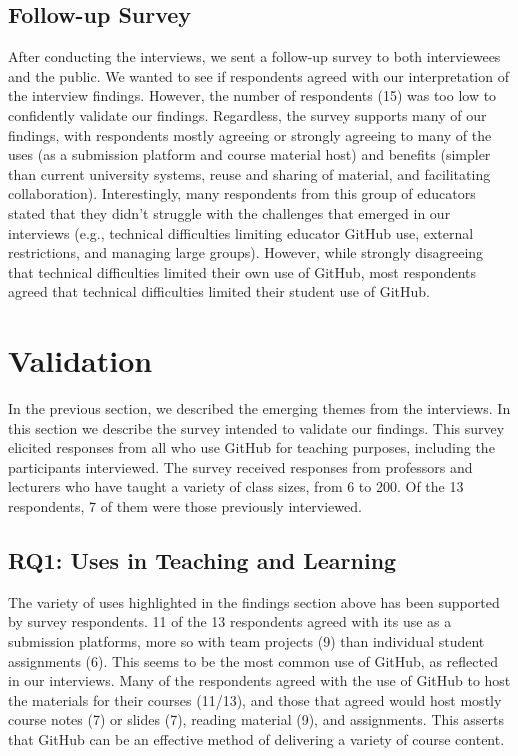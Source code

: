 \subsection{Follow-up Survey}
After conducting the interviews, we sent a follow-up survey to both interviewees and the public. We wanted to see if respondents agreed with our interpretation of the interview findings. However, the number of respondents (15) was too low to confidently validate our findings. Regardless, the survey supports many of our findings, with respondents mostly agreeing or strongly agreeing to many of the uses (as a submission platform and course material host) and benefits (simpler than current university systems, reuse and sharing of material, and facilitating collaboration). Interestingly, many respondents from this group of educators stated that they didn't struggle with the challenges that emerged in our interviews (e.g., technical difficulties limiting educator GitHub use, external restrictions, and managing large groups). However, while strongly disagreeing that technical difficulties limited their own use of GitHub, most respondents agreed that technical difficulties limited their student use of GitHub.

\section{Validation}
\label{sec:validation survey}
In the previous section, we described the emerging themes from the interviews. In this section we describe the survey intended to validate our findings. This survey elicited responses from all who use GitHub for teaching purposes, including the participants interviewed. The survey received responses from professors and lecturers who have taught a variety of class sizes, from 6 to 200. Of the 13 respondents, 7 of them were those previously interviewed.


\subsection{RQ1: Uses in Teaching and Learning}
The variety of uses highlighted in the findings section above has been supported by survey respondents. 11 of the 13 respondents agreed with its use as a submission platforms, more so with team projects (9) than individual student assignments (6). This seems to be the most common use of GitHub, as reflected in our interviews. Many of the respondents agreed with the use of GitHub to host the materials for their courses (11/13), and those that agreed would host mostly course notes (7) or slides (7), reading material (9), and assignments. This asserts that GitHub can be an effective method of delivering a variety of course content.

